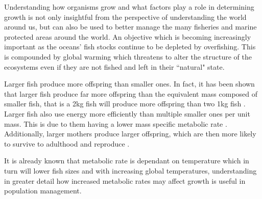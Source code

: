 \documentclass[a4paper, 11pt, hidelinks]{article} %
\begin{document}
	Understanding how organisms grow and what factors play a role in determining growth is not only insightful from the perspective of understanding the world around us, but can also be used to better manage the many fisheries and marine protected areas around the world.  An objective which is becoming increasingly important as the oceans' fish stocks continue to be depleted by overfishing. 
	This is compounded by global warming which threatens to alter the structure of the ecosystems even if they are not fished and left in their ``natural" state. 
	
	Larger fish produce more offspring than smaller ones.  %
	In fact, it has been shown that larger fish produce far more offspring than the equivalent mass composed of smaller fish,  that is a 2kg fish will produce more offspring than two 1kg fish \parencite{Barneche2018}.
	Larger fish also use energy more efficiently than multiple smaller ones per unit mass.  This is due to them having a lower mass specific metabolic rate \parencite{Peters1983, Kleiber1932, Brown2004}.  
	Additionally, larger mothers produce larger offspring, which are then more likely to survive to adulthood and reproduce \parencite{Hixon2014, Marshall2006}. %
	
	It is already known that metabolic rate is dependant on temperature which in turn will lower fish sizes \parencite{Gillooly2001, Brown2004} and with increasing global temperatures, understanding in greater detail how increased metabolic rates may affect growth is useful in population management.
	
	
\end{document}
